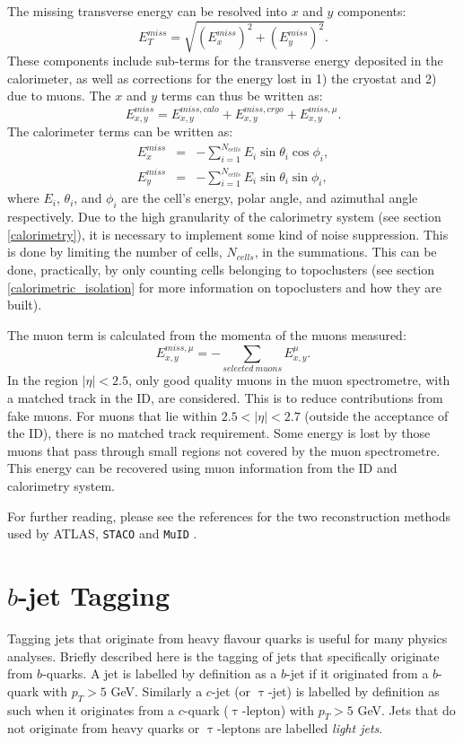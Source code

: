 The missing transverse energy can be resolved into $x$ and $y$ components:
\begin{equation}
E_{T}^{miss} = \sqrt{\left( E_{x}^{miss} \right)^{2} + \left( E_{y}^{miss} \right)^{2}}.
\end{equation}
These components include sub-terms for the transverse energy deposited in the calorimeter, as well as corrections for the energy lost in 1) the cryostat and 2) due to muons. The $x$ and $y$ terms can thus be written as:
\begin{equation}
E_{x,y}^{miss} = E_{x,y}^{miss,calo} + E_{x,y}^{miss,cryo} + E_{x,y}^{miss,\mu}.
\end{equation}
The calorimeter terms can be written as:
\begin{eqnarray}
E_{x}^{miss} &=& - \sum_{i=1}^{N_{cells}} E_{i} \sin \theta_{i} \cos \phi_{i}, \\
E_{y}^{miss} &=& - \sum_{i=1}^{N_{cells}} E_{i} \sin \theta_{i} \sin \phi_{i},
\end{eqnarray}
where $E_{i}$, $\theta_{i}$, and $\phi_{i}$ are the cell's energy, polar angle, and azimuthal angle respectively. Due to the high granularity of the calorimetry system (see section \ref{calorimetry}), it is necessary to implement some kind of noise suppression. This is done by limiting the number of cells, $N_{cells}$, in the summations. This can be done, practically, by only counting cells belonging to topoclusters (see section \ref{calorimetric_isolation} for more information on topoclusters and how they are built).

The muon term is calculated from the momenta of the muons measured:
\begin{equation}
E_{x,y}^{miss,\mu} = - \sum_{selected \ muons} E_{x,y}^{\mu}.
\end{equation}
In the region $|\eta | <2.5$, only good quality muons in the muon spectrometre, with a matched track in the ID, are considered. This is to reduce contributions from fake muons. For muons that lie within $2.5 < | \eta | < 2.7$ (outside the acceptance of the ID), there is no matched track requirement. Some energy is lost by those muons that pass through small regions not covered by the muon spectrometre. This energy can be recovered using muon information from the ID and calorimetry system.

For further reading, please see the references for the two reconstruction methods used by ATLAS, \verb!STACO! \cite{STACO} and \verb!MuID! \cite{MuID}.
\section{$b$-jet Tagging}
Tagging jets that originate from heavy flavour quarks is useful for many physics analyses. Briefly described here is the tagging of jets that specifically originate from $b$-quarks. A jet is labelled by definition as a $b$-jet if it originated from a  $b$-quark with $p_{T} > 5$ GeV. Similarly a $c$-jet (or $\uptau$-jet) is labelled by definition as such when it originates from a $c$-quark ($\uptau$-lepton) with $p_{T} > 5$ GeV. Jets that do not originate from heavy quarks or $\uptau$-leptons are labelled \emph{light jets}.
